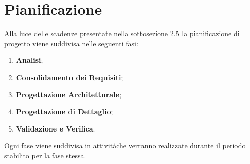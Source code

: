 \section{Pianificazione}
Alla luce delle scadenze presentate nella \hyperlink{scadenze}{sottosezione 2.5} la pianificazione di progetto viene suddivisa nelle seguenti fasi:
\begin{enumerate}
	\item \textbf{Analisi};
	\item \textbf{Consolidamento dei Requisiti};
	\item \textbf{Progettazione Architetturale};
	\item \textbf{Progettazione di Dettaglio};
	\item \textbf{Validazione e Verifica}.
\end{enumerate}
Ogni fase viene suddivisa in attività\glosp che verranno realizzate durante il 
periodo stabilito per la fase stessa. 
